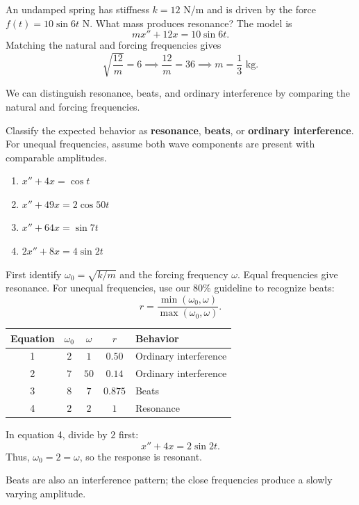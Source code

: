 \documentclass[10pt,letterpaper]{article}
\begin{document}
\begin{example}[4]{
An undamped spring has stiffness $k=12$ N/m and is
driven by the force $f(t)=10\sin6t$ N.
What mass produces resonance?
}
The model is
\[
mx''+12x=10\sin6t.
\]
Matching the natural and forcing frequencies gives
\[
\sqrt{\frac{12}{m}}=6
\implies \frac{12}{m}=36
\implies \boxed{m=\frac13\text{ kg}.}
\]
\end{example}

We can distinguish resonance, beats, and ordinary
interference by comparing the natural and forcing frequencies.

\begin{example}[5]{
Classify the expected behavior as \textbf{resonance},
\textbf{beats}, or \textbf{ordinary interference}.
For unequal frequencies, assume both wave components
are present with comparable amplitudes.
\begin{enumerate}
    \item $x''+4x=\cos t$
    \item $x''+49x=2\cos50t$
    \item $x''+64x=\sin7t$
    \item $2x''+8x=4\sin2t$
\end{enumerate}
}
First identify $\omega_0=\sqrt{k/m}$ and the forcing
frequency $\omega$. Equal frequencies give resonance.
For unequal frequencies, use our $80\%$ guideline
to recognize beats:
\[
r=\frac{\min(\omega_0,\omega)}{\max(\omega_0,\omega)}.
\]

\begin{center}
\renewcommand{\arraystretch}{1.3}
\begin{tabular}{c|c|c|c|l}
Equation & $\omega_0$ & $\omega$ & $r$ & Behavior\\
\hline
1 & $2$ & $1$ & $0.50$ & Ordinary interference\\
2 & $7$ & $50$ & $0.14$ & Ordinary interference\\
3 & $8$ & $7$ & $0.875$ & Beats\\
4 & $2$ & $2$ & $1$ & Resonance
\end{tabular}
\end{center}

In equation 4, divide by $2$ first:
\[
x''+4x=2\sin2t.
\]
Thus, $\omega_0=2=\omega$, so the response is resonant.

Beats are also an interference pattern; the close
frequencies produce a slowly varying amplitude.
\end{example}

\end{document}
